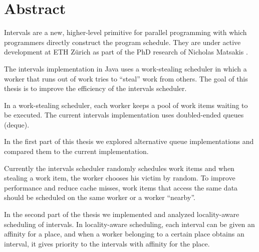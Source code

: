 
\chapter*{Abstract}
\label{chap:abstract}

Intervals are a new, higher-level primitive for parallel programming
with which programmers directly construct the program schedule. They
are under active development at ETH Zürich as part of the PhD research
of Nicholas Matsakis \cite{Matsakis2010}.

The intervals implementation in Java uses a work-stealing scheduler in
which a worker that runs out of work tries to ``steal'' work from
others. The goal of this thesis is to improve the efficiency of the
intervals scheduler.


In a work-stealing scheduler, each worker keeps a pool of work items
waiting to be executed. The current intervals implementation uses
doubled-ended queues (deque).  

In the first part of this thesis we explored alternative queue
implementations and compared them to the current implementation.


Currently the intervals scheduler randomly schedules work items and
when stealing a work item, the worker chooses his victim by random. To
improve performance and reduce cache misses, work items that access
the same data should be scheduled on the same worker or a worker
``nearby''.

In the second part of the thesis we implemented and analyzed
locality-aware scheduling of intervals. In locality-aware scheduling,
each interval can be given an affinity for a place, and when a worker
belonging to a certain place obtains an interval, it gives priority to
the intervals with affinity for the place.


